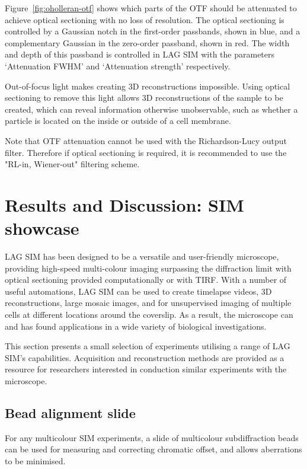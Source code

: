 Figure~\ref{fig:oholleran-otf} shows which parts of the OTF should be attenuated to achieve optical sectioning with no loss of resolution. 
The optical sectioning is controlled by a Gaussian notch in the first-order passbands, shown in blue, and a complementary Gaussian in the zero-order passband, shown in red. 
The width and depth of this passband is controlled in LAG SIM with the parameters `Attenuation FWHM' and `Attenuation strength' respectively.


Out-of-focus light makes creating 3D reconstructions impossible. %
Using optical sectioning to remove this light allows 3D reconstructions of the sample to be created, which can reveal information otherwise unobservable, such as whether a particle is located on the inside or outside of a cell membrane. 

Note that OTF attenuation cannot be used with the Richardson-Lucy output filter. 
Therefore if optical sectioning is required, it is recommended to use the "RL-in, Wiener-out" filtering scheme. 


\section{Results and Discussion: SIM showcase} \label{sec:sim-showcase}
LAG SIM has been designed to be a versatile and user-friendly microscope, providing high-speed multi-colour imaging surpassing the diffraction limit with optical sectioning provided computationally or with TIRF. 
With a number of useful automations, LAG SIM can be used to create timelapse videos, 3D reconstructions, large mosaic images, and for unsupervised imaging of multiple cells at different locations around the coverslip. 
As a result, the microscope can and has found applications in a wide variety of biological investigations.

This section presents a small selection of experiments utilising a range of LAG SIM's capabilities. 
Acquisition and reconstruction methods are provided as a resource for researchers interested in conduction similar experiments with the microscope. 

\subsection{Bead alignment slide}
For any multicolour SIM experiments, a slide of multicolour subdiffraction beads can be used for measuring and correcting chromatic offset, and allows aberrations to be minimised. 

